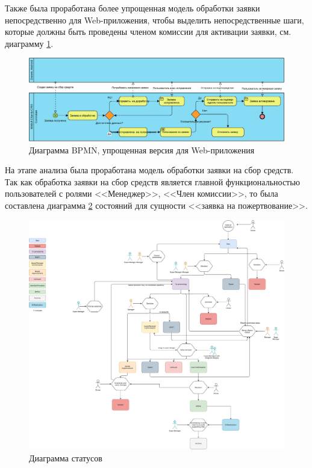 \documentclass[a4paper,12pt,reqno]{article}
\begin{document}
Также была проработана более упрощенная модель обработки заявки непосредственно для Web-приложения, чтобы выделить непосредственные шаги, которые должны быть проведены членом комиссии для активации заявки, см. диаграмму \ref{pic: short_bpmn}. 

\begin{figure}[H]
		\centering
		\includegraphics[width = \linewidth]{img/BPMN_web_status.pdf}
		\caption{Диаграмма BPMN, упрощенная версия для Web-приложения}
		\label{pic: short_bpmn}
\end{figure}


На этапе анализа была проработана модель обработки заявки на сбор средств. Так как обработка заявки на сбор средств является главной функциональностью пользователей с ролями <<Менеджер>>, <<Член комиссии>>, то была составлена диаграмма \ref{pic: status} состояний для сущности <<заявка на пожертвование>>. 

\begin{figure}[H]
		\centering
		\includegraphics[width = 0.9\linewidth]{img/statusflow.pdf}
		\caption{Диаграмма статусов}
		\label{pic: status}
\end{figure}
\end{document}

